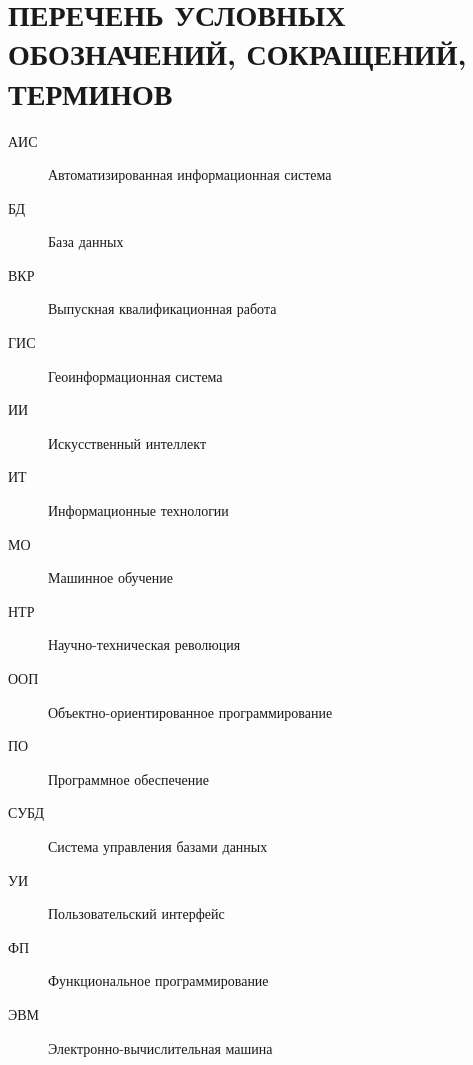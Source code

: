 \chapter*{ПЕРЕЧЕНЬ УСЛОВНЫХ ОБОЗНАЧЕНИЙ, СОКРАЩЕНИЙ, ТЕРМИНОВ}

\vspace{1cm}

\begin{description}
    \item[АИС] Автоматизированная информационная система
    \item[БД] База данных
    \item[ВКР] Выпускная квалификационная работа
    \item[ГИС] Геоинформационная система
    \item[ИИ] Искусственный интеллект
    \item[ИТ] Информационные технологии
    \item[МО] Машинное обучение
    \item[НТР] Научно-техническая революция
    \item[ООП] Объектно-ориентированное программирование
    \item[ПО] Программное обеспечение
    \item[СУБД] Система управления базами данных
    \item[УИ] Пользовательский интерфейс
    \item[ФП] Функциональное программирование
    \item[ЭВМ] Электронно-вычислительная машина
\end{description}
